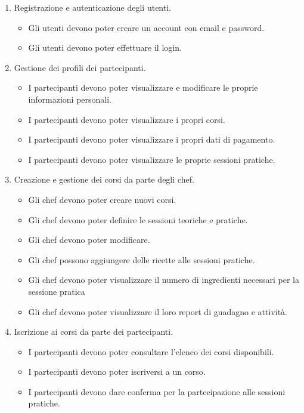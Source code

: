\begin{enumerate}
    \item Registrazione e autenticazione degli utenti.
    \begin{itemize}
        \item Gli utenti devono poter creare un account con email e password.
        \item Gli utenti devono poter effettuare il login.
    \end{itemize}

    \item Gestione dei profili dei partecipanti.
    \begin{itemize}
        \item I partecipanti devono poter visualizzare e modificare le proprie informazioni personali.
        \item I partecipanti devono poter visualizzare i propri corsi.
        \item I partecipanti devono poter visualizzare i propri dati di pagamento.
        \item I partecipanti devono poter visualizzare le proprie sessioni pratiche.
    \end{itemize}

    \item Creazione e gestione dei corsi da parte degli chef.
    \begin{itemize}
        \item Gli chef devono poter creare nuovi corsi.
        \item Gli chef devono poter definire le sessioni teoriche e pratiche.
        \item Gli chef devono poter modificare.
        \item Gli chef possono aggiungere delle ricette alle sessioni pratiche.
        \item Gli chef devono poter visualizzare il numero di ingredienti necessari per la sessione pratica
        \item Gli chef devono poter visualizzare il loro report di guadagno e attività.
    \end{itemize}

    \item Iscrizione ai corsi da parte dei partecipanti.
    \begin{itemize}
        \item I partecipanti devono poter consultare l’elenco dei corsi disponibili.
        \item I partecipanti devono poter iscriversi a un corso.
        \item I partecipanti devono dare conferma per la partecipazione alle sessioni pratiche.
    \end{itemize}


\end{enumerate}
